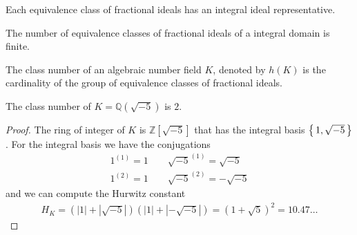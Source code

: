 \begin{thmbox}
    \begin{theorem}
        Each equivalence class of fractional ideals has an integral ideal representative.
    \end{theorem}
\end{thmbox}

\begin{thmbox}
    \begin{theorem}
        The number of equivalence classes of fractional ideals of a integral domain is finite.
    \end{theorem}
\end{thmbox}

\begin{defbox}
    \begin{definition}
        The class number of an algebraic number field \(K\), denoted by \(h(K)\) is the cardinality of the group of equivalence classes of fractional ideals.
    \end{definition}
\end{defbox}

\begin{example}
    The class number of \(K = \mathbb{Q}(\sqrt{-5})\) is \(2\).
\end{example}
\begin{proof}
    The ring of integer of \(K\) is \(\mathbb{Z}[\sqrt{-5}]\) that has the integral basis \(\left\{\, 1, \sqrt{-5} \,\right\}\). For the integral basis we have the conjugations
    \begin{align*}
        1^{(1)} = 1 \qquad \sqrt{-5}^{(1)} = \sqrt{-5}\\
        1^{(2)} = 1 \qquad \sqrt{-5}^{(2)} = -\sqrt{-5}
    \end{align*}
    and we can compute the Hurwitz constant
    \begin{align*}
        H_K = \left(|1| + |\sqrt{-5}|\right) \left(|1| + |-\sqrt{-5}|\right) = (1 + \sqrt{5})^2 = 10.47\ldots
    \end{align*}
\end{proof}
